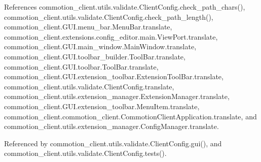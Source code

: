 References commotion\-\_\-client.\-utils.\-validate.\-Client\-Config.\-check\-\_\-path\-\_\-chars(), commotion\-\_\-client.\-utils.\-validate.\-Client\-Config.\-check\-\_\-path\-\_\-length(), commotion\-\_\-client.\-G\-U\-I.\-menu\-\_\-bar.\-Menu\-Bar.\-translate, commotion\-\_\-client.\-extensions.\-config\-\_\-editor.\-main.\-View\-Port.\-translate, commotion\-\_\-client.\-G\-U\-I.\-main\-\_\-window.\-Main\-Window.\-translate, commotion\-\_\-client.\-G\-U\-I.\-toolbar\-\_\-builder.\-Tool\-Bar.\-translate, commotion\-\_\-client.\-G\-U\-I.\-toolbar.\-Tool\-Bar.\-translate, commotion\-\_\-client.\-G\-U\-I.\-extension\-\_\-toolbar.\-Extension\-Tool\-Bar.\-translate, commotion\-\_\-client.\-utils.\-validate.\-Client\-Config.\-translate, commotion\-\_\-client.\-utils.\-extension\-\_\-manager.\-Extension\-Manager.\-translate, commotion\-\_\-client.\-G\-U\-I.\-extension\-\_\-toolbar.\-Menu\-Item.\-translate, commotion\-\_\-client.\-commotion\-\_\-client.\-Commotion\-Client\-Application.\-translate, and commotion\-\_\-client.\-utils.\-extension\-\_\-manager.\-Config\-Manager.\-translate.



Referenced by commotion\-\_\-client.\-utils.\-validate.\-Client\-Config.\-gui(), and commotion\-\_\-client.\-utils.\-validate.\-Client\-Config.\-tests().


